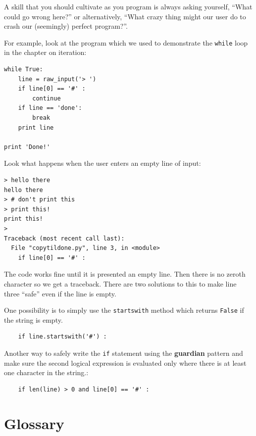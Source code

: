 \documentclass[10pt]{book}
\begin{document}
A skill that you should cultivate as you program is always
asking yourself, ``What could go wrong here?'' or alternatively,
``What crazy thing might our user do to crash our (seemingly) 
perfect program?''.

For example, look at the program which we used to demonstrate
the {\tt while} loop in the chapter on iteration:

\beforeverb
\begin{verbatim}
while True:
    line = raw_input('> ')
    if line[0] == '#' :
        continue
    if line == 'done':
        break
    print line

print 'Done!'
\end{verbatim}
\afterverb
%
Look what happens when the user enters an empty line of input:

\beforeverb
\begin{verbatim}
> hello there
hello there
> # don't print this
> print this!
print this!
> 
Traceback (most recent call last):
  File "copytildone.py", line 3, in <module>
    if line[0] == '#' :
\end{verbatim}
\afterverb
%
The code works fine until it is presented an empty line.  Then
there is no zeroth character so we get a traceback.  There are two
solutions to this to make line three ``safe'' even if the line is 
empty.

One possibility is to simply use the {\tt startswith} method
which returns {\tt False} if the string is empty.

\beforeverb
\begin{verbatim}
    if line.startswith('#') :
\end{verbatim}
\afterverb
%
Another way to safely write the {\tt if} statement using the {\bf guardian}
pattern and make sure the second logical expression is evaluated 
only where there is at least one character in the string.:

\beforeverb
\begin{verbatim}
    if len(line) > 0 and line[0] == '#' :
\end{verbatim}
\afterverb
%

\section{Glossary}
\end{document}
